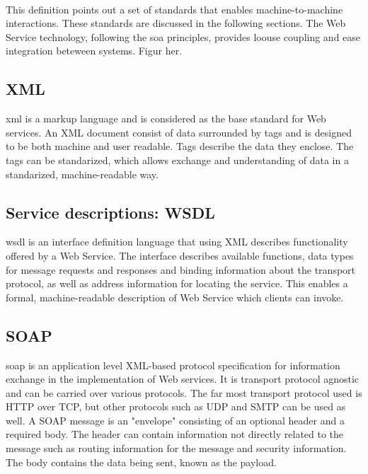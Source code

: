 \documentclass[USenglish]{ifimaster}
\begin{document}
\paragraph{}

This definition points out a set of standards that enables machine-to-machine
interactions. These standards are discussed in the following sections. The Web
Service technology, following the \gls{soa} principles, provides loouse coupling
and ease integration beteween systems. Figur her.


\subsection{XML}

\gls{xml} is a markup language and is considered as the base standard for Web
services. An XML document consist of data surrounded by tags and is designed to
be both machine and user readable. Tags describe the data they enclose. The tags
can be standarized, which allows exchange and understanding of data in a
standarized, machine-readable way.


\subsection{Service descriptions: WSDL}

\gls{wsdl} is an interface definition language that using XML describes
functionality offered by a Web Service. The interface describes available
functions, data types for message requests and responses and binding information
about the transport protocol, as well as address information for locating the
service. This enables a formal, machine-readable description of Web Service
which clients can invoke.


\subsection{SOAP}

\gls{soap} is an application level XML-based protocol specification for
information exchange in the implementation of Web services. It is transport
protocol agnostic and can be carried over various protocols. The far most
transport protocol used is HTTP over TCP, but other protocols such as UDP and
SMTP can be used as well. A SOAP message is an "envelope" consisting of an
optional header and a required body. The header can contain information not
directly related to the message such as routing information for the message and
security information. The body contains the data being sent, known as the
payload.
\end{document}
